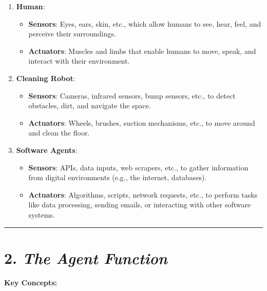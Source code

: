 \documentclass[
]{article}
\begin{document}
\begin{enumerate}
\def\labelenumi{\arabic{enumi}.}
\item
  \textbf{Human}:

  \begin{itemize}
  \item
    \textbf{Sensors}: Eyes, ears, skin, etc., which allow humans to see,
    hear, feel, and perceive their surroundings.
  \item
    \textbf{Actuators}: Muscles and limbs that enable humans to move,
    speak, and interact with their environment.
  \end{itemize}
\item
  \textbf{Cleaning Robot}:

  \begin{itemize}
  \item
    \textbf{Sensors}: Cameras, infrared sensors, bump sensors, etc., to
    detect obstacles, dirt, and navigate the space.
  \item
    \textbf{Actuators}: Wheels, brushes, suction mechanisms, etc., to
    move around and clean the floor.
  \end{itemize}
\item
  \textbf{Software Agents}:

  \begin{itemize}
  \item
    \textbf{Sensors}: APIs, data inputs, web scrapers, etc., to gather
    information from digital environments (e.g., the internet,
    databases).
  \item
    \textbf{Actuators}: Algorithms, scripts, network requests, etc., to
    perform tasks like data processing, sending emails, or interacting
    with other software systems.
  \end{itemize}
\end{enumerate}

\begin{center}\rule{0.5\linewidth}{0.5pt}\end{center}

\section{\texorpdfstring{2. \emph{The Agent
Function}}{2. The Agent Function}}\label{2-the-agent-function}

\paragraph{Key Concepts:}\label{key-concepts}
\end{document}
